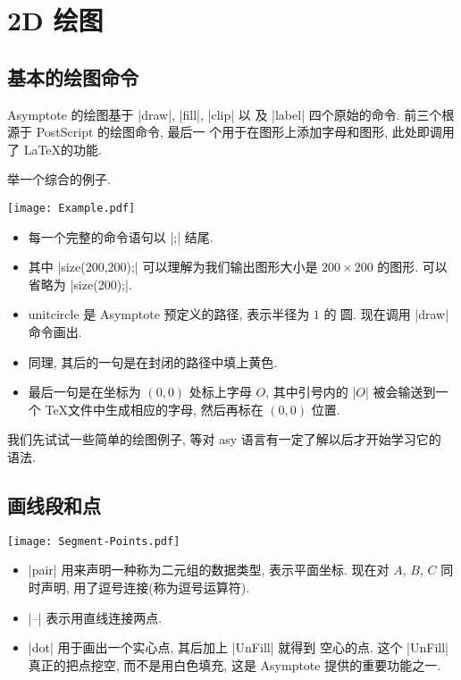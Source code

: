 \documentclass{ctexbook}
\begin{document}


\setcounter{chapter}{1}
\chapter{2D 绘图}

\section{基本的绘图命令}
Asymptote 的绘图基于 |draw|, |fill|, |clip| 以
及 |label| 四个原始的命令. 前三个根源于 PostScript 的绘图命令, 最后一
个用于在图形上添加字母和图形, 此处即调用了 \LaTeX 的功能.

举一个综合的例子.
\begin{center}\texttt{[image: Example.pdf]}\end{center}%

\begin{itemize}
\item 每一个完整的命令语句以 |;| 结尾.
\item 其中 |size(200,200);| 可以理解为我们输出图形大小是 $200\times 200$ 
  的图形. 可以省略为 |size(200);|.
\item {unitcircle} 是 Asymptote 预定义的路径, 表示半径为 $1$ 的
  圆. 现在调用 |draw| 命令画出.
\item 同理, 其后的一句是在封闭的路径中填上黄色.
\item 最后一句是在坐标为 $(0,0)$ 处标上字母 $O$, 其中引号内的 |$O$|
  被会输送到一个 \TeX 文件中生成相应的字母, 然后再标在 $(0,0)$ 位置. 
\end{itemize}

我们先试试一些简单的绘图例子, 等对 asy 语言有一定了解以后才开始学习它的
语法.

\section{画线段和点}
\begin{center}\texttt{[image: Segment-Points.pdf]}\end{center}%

\begin{itemize}
\item |pair| 用来声明一种称为二元组的数据类型, 表示平面坐标. 现在对 $A$,
  $B$, $C$ 同时声明, 用了逗号连接(称为逗号运算符).
\item |--| 表示用直线连接两点.
\item |dot| 用于画出一个实心点, 其后加上 |UnFill| 就得到
  空心的点. 这个 |UnFill| 真正的把点挖空, 而不是用白色填充, 这是
  Asymptote 提供的重要功能之一.
\end{itemize}
\end{document}
